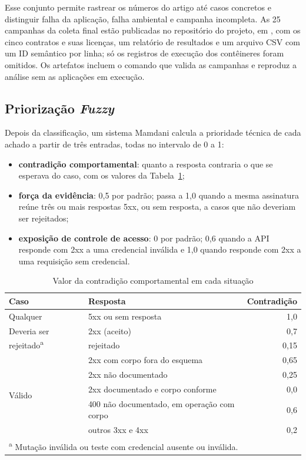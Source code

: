 Esse conjunto permite rastrear os números do artigo até casos concretos e
distinguir falha da aplicação, falha ambiental e campanha incompleta. As 25
campanhas da coleta final estão publicadas no repositório do projeto, em
,
com os cinco contratos e suas licenças, um relatório de resultados e um arquivo
CSV com um ID semântico por linha; só os registros de execução dos contêineres
foram omitidos. Os artefatos incluem o comando que valida as campanhas e reproduz a
análise sem as aplicações em execução.

\subsection{Priorização \textit{Fuzzy}}\label{sec:fis}

Depois da classificação, um sistema Mamdani calcula a prioridade técnica de
cada achado a partir de três entradas, todas no intervalo de 0 a 1:

\begin{itemize}
    \item \textbf{contradição comportamental}: quanto a resposta contraria o
    que se esperava do caso, com os valores da
    Tabela~\ref{tab:entradas-fis};
    \item \textbf{força da evidência}: 0,5 por padrão; passa a 1,0 quando a
    mesma assinatura reúne três ou mais respostas 5xx, ou sem resposta, a
    casos que não deveriam ser rejeitados;
    \item \textbf{exposição de controle de acesso}: 0 por padrão; 0,6 quando a
    API responde com 2xx a uma credencial inválida e 1,0 quando responde com
    2xx a uma requisição sem credencial.
\end{itemize}

\begin{table}[H]
\centering
\caption{Valor da contradição comportamental em cada situação}
\label{tab:entradas-fis}
\small
\begin{tabular}{|l|l|r|}
\hline
\textbf{Caso} & \textbf{Resposta} & \textbf{Contradição} \\ \hline
Qualquer & 5xx ou sem resposta & 1,0 \\ \hline
\multirow{2}{*}{Deveria ser rejeitado\textsuperscript{a}} & 2xx (aceito) & 0,7 \\ \cline{2-3}
 & rejeitado & 0,15 \\ \hline
\multirow{5}{*}{Válido} & 2xx com corpo fora do esquema & 0,65 \\ \cline{2-3}
 & 2xx não documentado & 0,25 \\ \cline{2-3}
 & 2xx documentado e corpo conforme & 0,0 \\ \cline{2-3}
 & 400 não documentado, em operação com corpo & 0,6 \\ \cline{2-3}
 & outros 3xx e 4xx & 0,2 \\ \hline
\multicolumn{3}{l}{\footnotesize \textsuperscript{a} Mutação inválida ou teste
com credencial ausente ou inválida.}
\end{tabular}
\end{table}

